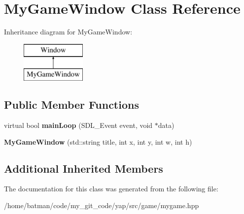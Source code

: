 \hypertarget{classMyGameWindow}{}\section{My\+Game\+Window Class Reference}
\label{classMyGameWindow}
Inheritance diagram for My\+Game\+Window\+:\begin{figure}[H]
\begin{center}
\leavevmode
\includegraphics[height=2.000000cm]{classMyGameWindow}
\end{center}
\end{figure}
\subsection*{Public Member Functions}
\begin{DoxyCompactItemize}
\item 
\hypertarget{classMyGameWindow_ac3e84e5b4383f38d08fd22e6d48bb730}{}virtual bool {\bfseries main\+Loop} (S\+D\+L\+\_\+\+Event event, void $\ast$data)\label{classMyGameWindow_ac3e84e5b4383f38d08fd22e6d48bb730}

\item 
\hypertarget{classMyGameWindow_a99600cb93953f642d2fca46c512f1e9a}{}{\bfseries My\+Game\+Window} (std\+::string title, int x, int y, int w, int h)\label{classMyGameWindow_a99600cb93953f642d2fca46c512f1e9a}

\end{DoxyCompactItemize}
\subsection*{Additional Inherited Members}


The documentation for this class was generated from the following file\+:\begin{DoxyCompactItemize}
\item 
/home/batman/code/my\+\_\+git\+\_\+code/yap/src/game/mygame.\+hpp\end{DoxyCompactItemize}

